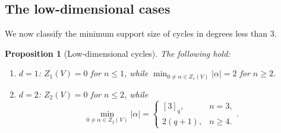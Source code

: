 \documentclass[11pt]{article}
\numberwithin{equation}{section}
\newtheorem{proposition}[theorem]{Proposition}
\begin{document}
\subsection{The low-dimensional cases}

We now classify the minimum support size of cycles in degrees less
than $3$.
\begin{proposition}[Low-dimensional cycles]
\label{prop:low-dimensional-cycles}
The following hold:
\begin{enumerate}
    \item $d=1$: $Z_1(V)=0$ for $n\le1$, while
    $\min_{0\ne\alpha\in Z_1(V)}|\alpha|=2$ for $n\ge2$.
    \item $d=2$: $Z_2(V)=0$ for $n\le2$, while
    \[
     \min_{0\ne\alpha\in Z_2(V)}|\alpha|
     =
     \begin{cases}
        [3]_q,&n=3,\\
        2(q+1),&n\ge4.
     \end{cases}.
    \]
\end{enumerate}
\end{proposition}
\end{document}
